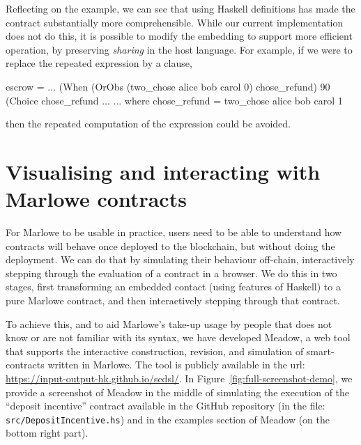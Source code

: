 \documentclass[runningheads]{llncs}
\begin{document}
Reflecting on the example, we can see that using Haskell definitions has made the contract substantially more 
comprehensible. While our current implementation does not do this, it is possible to modify the embedding to support 
more efficient operation, by preserving \emph{sharing} in the host language. For example, if we were to replace the 
repeated  expression 
 by a  clause, 
\begin{haskellcode}
escrow = ...        (When (OrObs (two_chose alice bob carol 0)
                                 chose_refund)
                          90
                          (Choice chose_refund ...
                           ...
         where chose_refund = two_chose alice bob carol 1                 
\end{haskellcode}
then the repeated computation of the expression could be avoided.

\section{Visualising and interacting with Marlowe contracts}

\label{section:tool}

For Marlowe to be usable in practice, users need to be able to understand how contracts will behave once deployed to 
the blockchain, but without doing the deployment. We can do that by simulating their behaviour off-chain, interactively 
stepping through the evaluation of a contract in a browser. We do this in two stages, first transforming an embedded 
contact (using features of Haskell) to a pure Marlowe contract, and then interactively stepping through that contract.

To achieve this, and to aid Marlowe's take-up
usage by people that does not know or are not familiar with its syntax,
we have developed Meadow, a web tool that supports the interactive construction,
revision, and simulation of smart-contracts written in Marlowe. The
tool is publicly available in the url: \url{https://input-output-hk.github.io/scdsl/}.
In Figure~\ref{fig:full-screenshot-demo}, we provide a screenshot
of Meadow in the middle of simulating the execution of the ``deposit incentive'' contract available
in the GitHub repository (in the file: \texttt{src/DepositIncentive.hs}) and in the examples section of Meadow (on the 
bottom right part).
\end{document}
